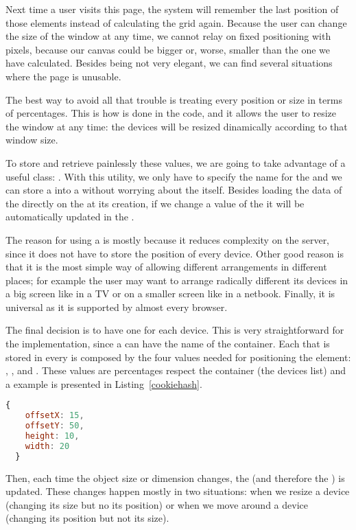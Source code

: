Next time a user visits this page, the system will remember the last position of those elements instead of calculating the grid again.
Because the user can change the size of the window at any time, we cannot relay on fixed positioning with pixels, because our canvas could be bigger or, worse, smaller than the one we have calculated.
Besides being not very elegant, we can find several situations where the page is unusable.

The best way to avoid all that trouble is treating every position or size in terms of percentages.
This is how is done in the code, and it allows the user to resize the window at any time: the devices will be resized dinamically according to that window size.

To store and retrieve painlessly these values, we are going to take advantage of a useful  class:  \cite{MooHashCookie}.
With this utility, we only have to specify the name for the  and we can store a  into a  without worrying about the  itself.
Besides loading the data of the  directly on the  at its creation, if we change a value of the  it will be automatically updated in the .

The reason for using a  is mostly because it reduces complexity on the server, since it does not have to store the position of every device.
Other good reason is that it is the most simple way of allowing different arrangements in different places; for example the user may want to arrange radically different its devices in a big screen like in a TV or on a smaller screen like in a netbook.
Finally, it is universal as it is supported by almost every browser.

The final decision is to have one  for each device.
This is very straightforward for the implementation, since a  can
have the name of the container.
Each  that is stored in every  is composed by the four
values needed for positioning the element: , ,
 and .
These values are percentages respect the container (the devices list) and a
 example is presented in Listing~\vref{cookiehash}.

\begin{lstlisting}[language=JavaScript,label=cookiehash,caption=Cookie Hash example]
  {
    offsetX: 15,
    offsetY: 50,
    height: 10,
    width: 20
  }
\end{lstlisting}

Then, each time the object size or dimension changes, the  (and therefore the ) is updated.
These changes happen mostly in two situations: when we resize a device (changing its size but no its position) or when we move around a device (changing its position but not its size).
